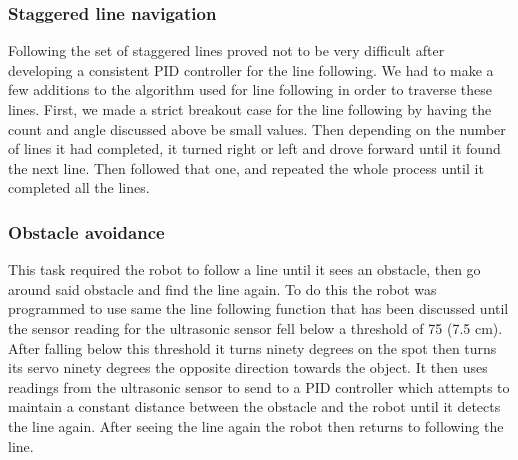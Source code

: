 \documentclass[12pt]{article}
\begin{document}
\subsubsection{Staggered line navigation}

Following the set of staggered lines proved not to be very difficult after developing a consistent PID controller for the line following. We had to make a few additions to the algorithm used for line following in order to traverse these lines. First, we made a strict breakout case for the line following by having the count and angle discussed above be small values. Then depending on the number of lines it had completed, it turned right or left and drove forward until it found the next line. Then followed that one, and repeated the whole process until it completed all the lines.

\subsubsection{Obstacle avoidance}

This task required the robot to follow a line until it sees an obstacle, then go around said obstacle and find the line again. To do this the robot was programmed to use same the line following function that has been discussed until the sensor reading for the ultrasonic sensor fell below a threshold of 75 (7.5 cm). After falling below this threshold it turns ninety degrees on the spot then turns its servo ninety degrees the opposite direction towards the object. It then uses readings from the ultrasonic sensor to send to a PID controller which attempts to maintain a constant distance between the obstacle and the robot until it detects the line again. After seeing the line again the robot then returns to following the line.

\end{document}
